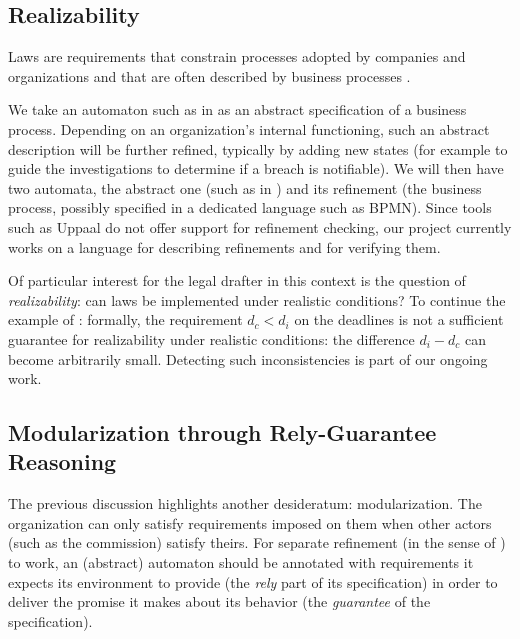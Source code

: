\subsection{Realizability}\label{sec:realizability}

Laws are requirements that constrain processes adopted by companies and
organizations and that are often described by business processes
\cite{aalst_business_provess_management_comprehensive_survey_2013}.

We take an automaton such as in  as an abstract
specification of a business process. Depending on an organization's internal
functioning, such an abstract description will be further refined, typically
by adding new states (for example to guide the investigations to determine if
a breach is notifiable). We will then have two automata, the abstract one
(such as in ) and its refinement (the business
process, possibly specified in a dedicated language such as BPMN). Since tools such
as Uppaal do not offer support for refinement checking, our project currently
works on a language for describing refinements and for verifying them.

Of particular interest for the legal drafter in this context is the question
of \emph{realizability}: can laws be implemented under realistic conditions?
To continue the example of : formally, the
requirement $d_c < d_i$ on the deadlines is not a sufficient guarantee for
realizability under realistic conditions: the difference $d_i - d_c$ can
become arbitrarily small. Detecting such inconsistencies is part of our
ongoing work.

\subsection{Modularization through Rely-Guarantee Reasoning}\label{sec:rely_guarantee}

The previous discussion highlights another desideratum: modularization. The
organization can only satisfy requirements imposed on them when other actors
(such as the commission) satisfy theirs. For separate refinement (in the sense
of ) to work, an (abstract) automaton should be
annotated with requirements it expects its environment to provide (the
\emph{rely} part of its specification) in order to deliver the promise it
makes about its behavior (the \emph{guarantee} of the specification). 

